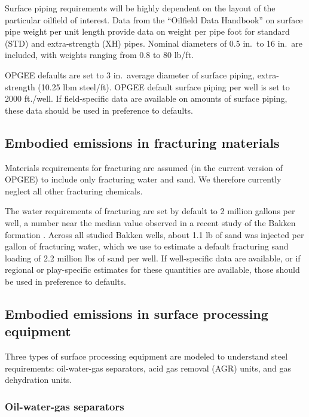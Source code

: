 \documentclass[11pt]{report}
\newcommand{\marg}[1]{{\footnotesize\textit{\textcolor{stanford}{'#1'}}}}
\newcommand{\marginnote}[1]{\marginpar{\marg{#1}}}
\begin{document}
{{{{Surface piping requirements will be highly dependent on the layout of the particular oilfield of interest. Data from the ``Oilfield Data Handbook'' \cite[p.26]{Apex2010} on surface pipe weight per \marginnote{Embodied Emissions 3.1} unit length provide data on weight per pipe foot for standard (STD) and extra-strength (XH) pipes. Nominal diameters of 0.5 in.\ to 16 in.\ are included, with weights ranging from 0.8 to 80 lb/ft.

OPGEE defaults are set to 3 in.\ average \marginnote{Embodied Emissions 3.2.1} diameter of surface piping, extra-strength (10.25 lbm steel/ft). OPGEE default surface piping per well is \marginnote{Embodied Emissions 3.2.4} set to 2000 ft./well. If field-specific data are available on amounts of surface piping, these data should be used in preference to defaults. 

\subsection{Embodied emissions in fracturing materials}

Materials requirements for fracturing are assumed (in the current version of OPGEE) to include only fracturing water and sand. We therefore currently neglect all other fracturing chemicals.

The water \marginnote{Embodied Emissions 2.5.1} requirements of fracturing are set by default to 2 million gallons per well, a number near the median value observed in a recent study of the Bakken formation \cite{Brandtetal2015}. Across all studied Bakken wells, about 1.1 lb of sand was injected per gallon of fracturing water, which we use to \marginnote{Embodied Emissions 2.5.4} estimate a default fracturing sand loading of 2.2 million lbs of sand per well. If well-specific data are available, or if regional or play-specific estimates for these quantities are available, those should be used in preference to defaults.

\subsection{Embodied emissions in surface processing equipment}

Three types of surface processing equipment are modeled to understand steel requirements: oil-water-gas separators, acid gas removal (AGR) units, and gas dehydration units.

\subsubsection{Oil-water-gas separators}

}}}}
\end{document}

